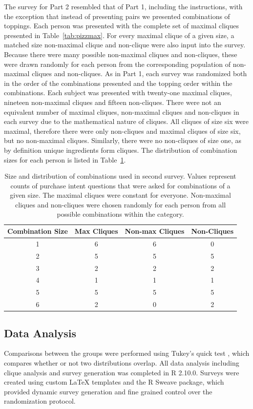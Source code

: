 The survey for Part 2 resembled that of Part 1, including the instructions, with the exception that instead of presenting pairs we presented combinations of toppings.   Each person was presented with the complete set of maximal cliques presented in Table~\ref{tab:pizzmax}.  For every maximal clique of a given size, a matched size non-maximal clique and non-clique were also input into the survey. Because there were many possible non-maximal cliques and non-cliques, these were drawn randomly for each person from the corresponding population of non-maximal cliques and non-cliques.  As in Part 1, each survey was randomized both in the order of the combinations presented and the topping order within the combinations.  Each subject was presented with twenty-one maximal cliques, nineteen non-maximal cliques and fifteen non-cliques.  There were not an equivalent number of maximal cliques, non-maximal cliques and non-cliques in each survey due to the mathematical nature of cliques.  All cliques of size six were maximal, therefore there were only non-cliques and maximal cliques of size six, but no non-maximal cliques.  Similarly,  there were no non-cliques of size one, as by definition unique ingredients form cliques.  The distribution of combination sizes for each person is listed in Table~\ref{tab:pizzdesign}.

\begin{table}[h!b!p!]
\caption[Size and distribution of combinations used in second survey.]{Size and distribution of combinations used in second survey. Values represent counts of purchase intent questions that were asked for combinations of a given size.  The maximal cliques were constant for everyone. Non-maximal cliques and non-cliques were chosen 
randomly for each person from all possible combinations within the category.}
\label{tab:pizzdesign}
\centering
\begin{tabular}{cccc}
\toprule
{\bf Combination Size} & {\bf Max Cliques} & {\bf Non-max Cliques} & {\bf Non-Cliques}  \\
\midrule
1 & 6 & 6 & 0 \\
2 & 5 & 5 & 5 \\
3 & 2 & 2 & 2 \\
4 & 1 & 1 & 1 \\
5 & 5 & 5 & 5 \\
6 & 2 & 0 & 2 \\
\bottomrule
\end{tabular}
\end{table}

\subsection{Data Analysis}
Comparisons between the groups were performed using Tukey’s quick test \citep{Tukey1959}, which compares whether or not two distributions overlap.  All data analysis including clique analysis and survey generation was completed in R 2.10.0.  Surveys were created using custom LaTeX templates and the R Sweave package, which provided dynamic survey generation and fine grained control over the randomization protocol.

